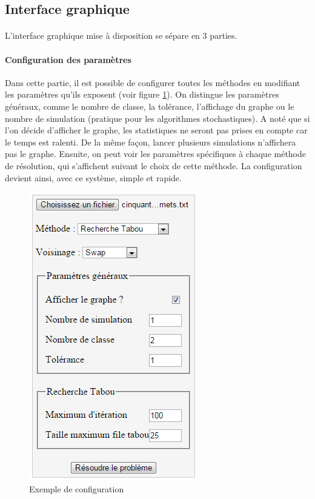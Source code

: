\documentclass[12pt]{article}
\begin{document}
\subsection{Interface graphique}

\paragraph{}L'interface graphique mise à disposition se sépare en 3 parties.

\paragraph{Configuration des paramètres} Dans cette partie, il est possible de configurer toutes les méthodes en modifiant les paramètres qu'ils exposent (voir figure \ref{fig:configuration}). On distingue les paramètres généraux, comme le nombre de classe, la tolérance, l'affichage du graphe ou le nombre de simulation (pratique pour les algorithmes stochastiques). A noté que si l'on décide d'afficher le graphe, les statistiques ne seront pas prises en compte car le temps est ralenti. De la même façon, lancer plusieurs simulations n'affichera pas le graphe. Ensuite, on peut voir les paramètres spécifiques à chaque méthode de résolution, qui s'affichent suivant le choix de cette méthode. La configuration devient ainsi, avec ce système, simple et rapide.

\begin{figure}[!h]
	\begin{center}
		\includegraphics[scale=0.5]{pictures/exempleConfiguration.png}
	\end{center}
	\caption{Exemple de configuration \label{fig:configuration}}
\end{figure}
\end{document}
